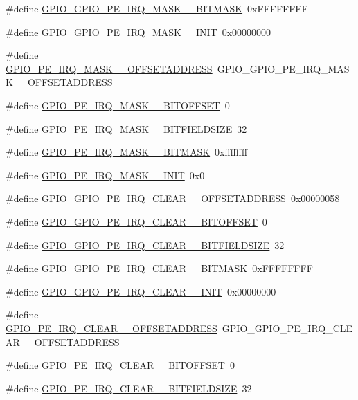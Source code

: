 \begin{DoxyCompactItemize}
\item 
\#define \hyperlink{a00553_a1b1a9449f7ede479ba4205782775c52c}{GPIO\_\-GPIO\_\-PE\_\-IRQ\_\-MASK\_\_\-BITMASK}~0xFFFFFFFF
\item 
\#define \hyperlink{a00553_a5f55a3f6928c6373532bf887a3c9fc88}{GPIO\_\-GPIO\_\-PE\_\-IRQ\_\-MASK\_\_\-INIT}~0x00000000
\item 
\#define \hyperlink{a00553_ad428b4d2b8775c00bf11e056827d1121}{GPIO\_\-PE\_\-IRQ\_\-MASK\_\_\-OFFSETADDRESS}~GPIO\_\-GPIO\_\-PE\_\-IRQ\_\-MASK\_\_\-OFFSETADDRESS
\item 
\#define \hyperlink{a00553_a166ec5586a43d23b589a2fd619e5ad89}{GPIO\_\-PE\_\-IRQ\_\-MASK\_\_\-BITOFFSET}~0
\item 
\#define \hyperlink{a00553_a3d2d7199731ad92510b5195bef723b3c}{GPIO\_\-PE\_\-IRQ\_\-MASK\_\_\-BITFIELDSIZE}~32
\item 
\#define \hyperlink{a00553_a38ea656f3ec9c1b30dff894e743f61c6}{GPIO\_\-PE\_\-IRQ\_\-MASK\_\_\-BITMASK}~0xffffffff
\item 
\#define \hyperlink{a00553_a404dc7d0a80db62f1dcb92b514b9ac14}{GPIO\_\-PE\_\-IRQ\_\-MASK\_\_\-INIT}~0x0
\item 
\#define \hyperlink{a00553_af4577010254ab8dde26cd155ced0c2bc}{GPIO\_\-GPIO\_\-PE\_\-IRQ\_\-CLEAR\_\_\-OFFSETADDRESS}~0x00000058
\item 
\#define \hyperlink{a00553_a32a3109c4f1321354f9cf73a0fda0ccc}{GPIO\_\-GPIO\_\-PE\_\-IRQ\_\-CLEAR\_\_\-BITOFFSET}~0
\item 
\#define \hyperlink{a00553_a6c9e2fc1bdcd2a488047a7705cc52b2e}{GPIO\_\-GPIO\_\-PE\_\-IRQ\_\-CLEAR\_\_\-BITFIELDSIZE}~32
\item 
\#define \hyperlink{a00553_a0b84a7984f953281a06cb1d94fad998b}{GPIO\_\-GPIO\_\-PE\_\-IRQ\_\-CLEAR\_\_\-BITMASK}~0xFFFFFFFF
\item 
\#define \hyperlink{a00553_add376c81f640757ed28b775145924896}{GPIO\_\-GPIO\_\-PE\_\-IRQ\_\-CLEAR\_\_\-INIT}~0x00000000
\item 
\#define \hyperlink{a00553_a1f4f08245993fc02ffa415fd66fb89f0}{GPIO\_\-PE\_\-IRQ\_\-CLEAR\_\_\-OFFSETADDRESS}~GPIO\_\-GPIO\_\-PE\_\-IRQ\_\-CLEAR\_\_\-OFFSETADDRESS
\item 
\#define \hyperlink{a00553_a4d9d65388ac6dca568cc65dbdc919561}{GPIO\_\-PE\_\-IRQ\_\-CLEAR\_\_\-BITOFFSET}~0
\item 
\#define \hyperlink{a00553_a4ef88afb07d342cc9ceb9aa187bae9e8}{GPIO\_\-PE\_\-IRQ\_\-CLEAR\_\_\-BITFIELDSIZE}~32
\item 

\end{DoxyCompactItemize}
